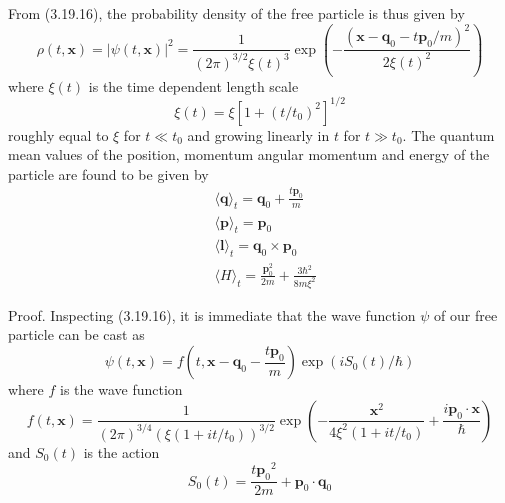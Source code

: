 \documentclass{article}
\begin{document}
From (3.19.16), the probability density of the free particle is thus given by
$$
\begin{equation*}
\rho(t, \boldsymbol{x})=|\psi(t, \boldsymbol{x})|^{2}=\frac{1}{(2 \pi)^{3 / 2} \xi(t)^{3}} \exp \left(-\frac{\left(\boldsymbol{x}-\boldsymbol{q}_{0}-t \boldsymbol{p}_{0} / m\right)^{2}}{2 \xi(t)^{2}}\right) \tag{3.19.21}
\end{equation*}
$$
where $\xi(t)$ is the time dependent length scale
$$
\begin{equation*}
\xi(t)=\xi\left[1+\left(t / t_{0}\right)^{2}\right]^{1 / 2} \tag{3.19.22}
\end{equation*}
$$
roughly equal to $\xi$ for $t \ll t_{0}$ and growing linearly in $t$ for $t \gg t_{0}$.
The quantum mean values of the position, momentum angular momentum and energy of the particle are found to be given by
$$
\begin{align*}
& \langle\boldsymbol{q}\rangle_{t}=\boldsymbol{q}_{0}+\frac{t \boldsymbol{p}_{0}}{m}  \tag{3.19.23}\\
& \langle\boldsymbol{p}\rangle_{t}=\boldsymbol{p}_{0}  \tag{3.19.24}\\
& \langle\boldsymbol{l}\rangle_{t}=\boldsymbol{q}_{0} \times \boldsymbol{p}_{0}  \tag{3.19.25}\\
& \langle H\rangle_{t}=\frac{\boldsymbol{p}_{0}^{2}}{2 m}+\frac{3 \hbar^{2}}{8 m \xi^{2}} \tag{3.19.26}
\end{align*}
$$

Proof. Inspecting (3.19.16), it is immediate that the wave function $\psi$ of our free particle can be cast as
$$
\begin{equation*}
\psi(t, \boldsymbol{x})=f\left(t, \boldsymbol{x}-\boldsymbol{q}_{0}-\frac{t \boldsymbol{p}_{0}}{m}\right) \exp \left(i S_{0}(t) / \hbar\right) \tag{3.19.27}
\end{equation*}
$$
where $f$ is the wave function
$$
\begin{equation*}
f(t, \boldsymbol{x})=\frac{1}{(2 \pi)^{3 / 4}\left(\xi\left(1+i t / t_{0}\right)\right)^{3 / 2}} \exp \left(-\frac{\boldsymbol{x}^{2}}{4 \xi^{2}\left(1+i t / t_{0}\right)}+\frac{i \boldsymbol{p}_{0} \cdot \boldsymbol{x}}{\hbar}\right) \tag{3.19.28}
\end{equation*}
$$
and $S_{0}(t)$ is the action
$$
\begin{equation*}
S_{0}(t)=\frac{t \boldsymbol{p}_{0}{ }^{2}}{2 m}+\boldsymbol{p}_{0} \cdot \boldsymbol{q}_{0} \tag{3.19.29}
\end{equation*}
$$
\end{document}

